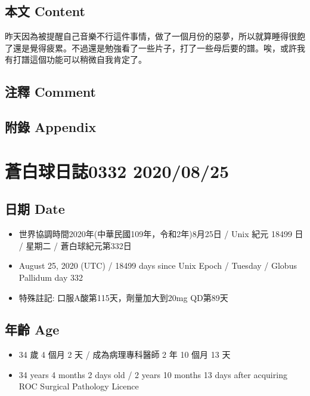 \documentclass[a5paper, 11pt
]{book}
\providecommand{\tightlist}{%
  \setlength{\itemsep}{0pt}\setlength{\parskip}{0pt}}
\begin{document}
\hypertarget{ux672cux6587-content-84}{%
\subsection{本文 Content}\label{ux672cux6587-content-84}}

昨天因為被提醒自己音樂不行這件事情，做了一個月份的惡夢，所以就算睡得很飽了還是覺得疲累。不過還是勉強看了一些片子，打了一些母后要的譜。唉，或許我有打譜這個功能可以稍微自我肯定了。

\hypertarget{ux6ce8ux91cb-comment-84}{%
\subsection{注釋 Comment}\label{ux6ce8ux91cb-comment-84}}

\hypertarget{ux9644ux9304-appendix-84}{%
\subsection{附錄 Appendix}\label{ux9644ux9304-appendix-84}}

\hypertarget{ux84bcux767dux7403ux65e5ux8a8c0332-20200825}{%
\section{蒼白球日誌0332
2020/08/25}\label{ux84bcux767dux7403ux65e5ux8a8c0332-20200825}}

\hypertarget{ux65e5ux671f-date-85}{%
\subsection{日期 Date}\label{ux65e5ux671f-date-85}}

\begin{itemize}
\tightlist
\item
  世界協調時間2020年(中華民國109年，令和2年)8月25日 / Unix 紀元 18499 日
  / 星期二 / 蒼白球紀元第332日
\item
  August 25, 2020 (UTC) / 18499 days since Unix Epoch / Tuesday / Globus
  Pallidum day 332
\item
  特殊註記: 口服A酸第115天，劑量加大到20mg QD第89天
\end{itemize}

\hypertarget{ux5e74ux9f61-age-85}{%
\subsection{年齡 Age}\label{ux5e74ux9f61-age-85}}

\begin{itemize}
\tightlist
\item
  34 歲 4 個月 2 天 / 成為病理專科醫師 2 年 10 個月 13 天
\item
  34 years 4 months 2 days old / 2 years 10 months 13 days after
  acquiring ROC Surgical Pathology Licence
\end{itemize}
\end{document}
